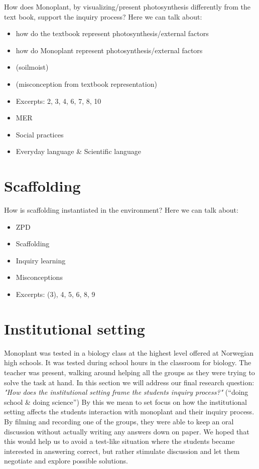 How does Monoplant, by visualizing/present photosynthesis differently from the text book, support the inquiry process? 
Here we can talk about: 
\begin{itemize}
\item{how do the textbook represent photosynthesis/external factors}
\item{how do Monoplant represent photosynthesis/external factors}
\item{ (soilmoist)}
\item{ (misconception from textbook representation)}
\item{Excerpts: 2, 3, 4, 6, 7, 8, 10}
\item{MER}
\item{Social practices}
\item{Everyday language \& Scientific language}
\end{itemize}




\section{Scaffolding}
How is scaffolding instantiated in the environment?
Here we can talk about: 
\begin{itemize}
\item{ZPD}
\item{Scaffolding}
\item{Inquiry learning}
\item{Misconceptions}
\item{Excerpts: (3), 4, 5, 6, 8, 9}
\end{itemize}



\section{Institutional setting}
Monoplant was tested in a biology class at the highest level offered at Norwegian high schools. It was tested during school hours in the classroom for biology. The teacher was present, walking around helping all the groups as they were trying to solve the task at hand. In this section we will address our final research question: \emph{"How does the institutional setting frame the students inquiry process?"} (“doing school \& doing science”)
By this we mean to set focus on how the institutional setting affects the students interaction with monoplant and their inquiry process. By filming and recording one of the groups, they were able to keep an oral discussion without actually writing any answers down on paper. We hoped that this would help us to avoid a test-like situation where the students became interested in answering correct, but rather stimulate discussion and let them negotiate and explore possible solutions.

